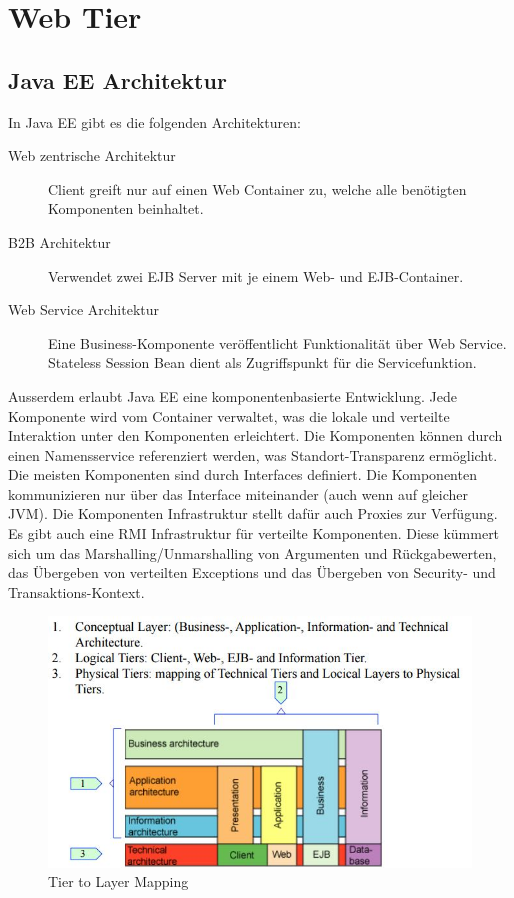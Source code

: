 \chapter{Web Tier}

\section{Java EE Architektur}

In Java EE gibt es die folgenden Architekturen:

\begin{description}
	\item[Web zentrische Architektur] Client greift nur auf einen Web Container zu, welche alle benötigten Komponenten beinhaltet.
	\item[B2B Architektur] Verwendet zwei EJB Server mit je einem Web- und EJB-Container.
	\item[Web Service Architektur] Eine Business-Komponente veröffentlicht Funktionalität über Web Service. Stateless Session Bean dient als Zugriffspunkt für die Servicefunktion.
\end{description}

Ausserdem erlaubt Java EE eine komponentenbasierte Entwicklung. Jede Komponente wird vom Container verwaltet, was die lokale und verteilte Interaktion unter den Komponenten erleichtert. Die Komponenten können durch einen Namensservice referenziert werden, was Standort-Transparenz ermöglicht. Die meisten Komponenten sind durch Interfaces definiert. Die Komponenten kommunizieren nur über das Interface miteinander (auch wenn auf gleicher JVM). Die Komponenten Infrastruktur stellt dafür auch Proxies zur Verfügung. Es gibt auch eine RMI Infrastruktur für verteilte Komponenten. Diese kümmert sich um das Marshalling/Unmarshalling von Argumenten und Rückgabewerten, das Übergeben von verteilten Exceptions und das Übergeben von Security- und Transaktions-Kontext.

\begin{figure}[h!]
\centering
\includegraphics[width=0.8\linewidth]{fig/webtier-tier-to-layer-mapping}
\caption{Tier to Layer Mapping}
\label{fig:webtier-tier-to-layer-mapping}
\end{figure}


